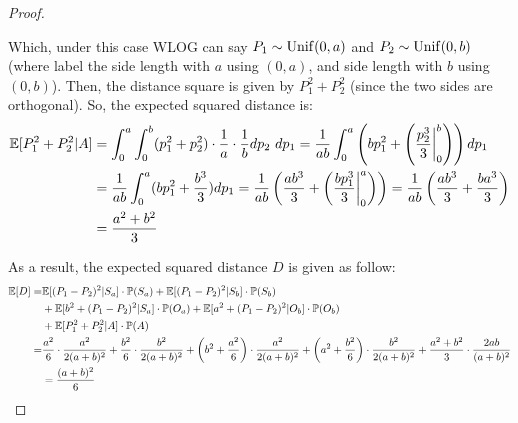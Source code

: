 \documentclass{article}
\begin{document}
\begin{proof}
\begin{enumerate}
        Which, under this case WLOG can say $P_1\sim \mathrm{Unif}(0,a)$ and $P_2\sim \mathrm{Unif}(0,b)$ (where label the side length with $a$ using $(0,a)$, and side length with $b$ using $(0,b)$). Then, the distance square is given by $P_1^2+P_2^2$ (since the two sides are orthogonal). So, the expected squared distance is:
        \begin{align}
            \EE[P_1^2+P_2^2|A] &= \int_{0}^{a}\int_{0}^{b}(p_1^2+p_2^2)\cdot\frac{1}{a}\cdot\frac{1}{b}dp_2\ dp_1 = \frac{1}{ab}\int_{0}^{a}\left(bp_1^2 + \left(\frac{p_2^3}{3}\bigg|_{0}^{b}\right)\right)dp_1\\
            &= \frac{1}{ab}\int_{0}^{a}(bp_1^2 + \frac{b^3}{3})dp_1 = \frac{1}{ab}\left(\frac{ab^3}{3}+\left(\frac{bp_1^3}{3}\bigg|_{0}^{a}\right)\right) = \frac{1}{ab}\left(\frac{ab^3}{3}+\frac{ba^3}{3}\right)\\
            &= \frac{a^2+b^2}{3}
        \end{align}
    \end{enumerate}
    As a result, the expected squared distance $D$ is given as follow:
    \begin{align}
        \mathbb{E}[D] =& \mathbb{E}[(P_1-P_2)^2|S_a]\cdot \mathbb{P}(S_a)+\mathbb{E}[(P_1-P_2)^2|S_b]\cdot \mathbb{P}(S_b)\\
        &+\mathbb{E}[b^2+(P_1-P_2)^2|S_a]\cdot \mathbb{P}(O_a)+\mathbb{E}[a^2+(P_1-P_2)^2|O_b]\cdot \mathbb{P}(O_b)\\
        &+ \mathbb{E}[P_1^2+P_2^2|A]\cdot\mathbb{P}(A)\\
        =& \frac{a^2}{6}\cdot \frac{a^2}{2(a+b)^2}+\frac{b^2}{6}\cdot \frac{b^2}{2(a+b)^2} + \left(b^2+\frac{a^2}{6}\right)\cdot\frac{a^2}{2(a+b)^2}+\left(a^2+\frac{b^2}{6}\right)\cdot\frac{b^2}{2(a+b)^2} + \frac{a^2+b^2}{3}\cdot \frac{2ab}{(a+b)^2}\\
        &= \frac{(a+b)^2}{6}
    \end{align}
\end{proof}

\newpage
\end{document}

